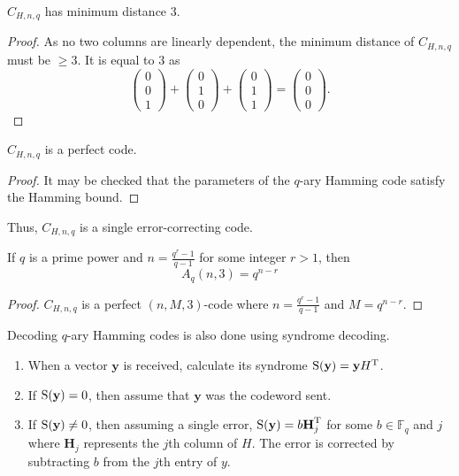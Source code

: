 \begin{theorem}
    $C_{H,n,q}$ has minimum distance $3$.
\end{theorem}
\begin{proof}
    As no two columns are linearly dependent, the minimum distance of $C_{H,n,q}$ must be $\geq 3$. It is equal to $3$ as
    $$
    \begin{pmatrix}
        0 \\ 0 \\ 1    
    \end{pmatrix}
    +
    \begin{pmatrix}
        0 \\ 1 \\ 0    
    \end{pmatrix}
    +
    \begin{pmatrix}
        0 \\ 1 \\ 1    
    \end{pmatrix}
    =
    \begin{pmatrix}
        0 \\ 0 \\ 0
    \end{pmatrix}.
    $$
\end{proof}

\begin{theorem}
    $C_{H,n,q}$ is a perfect code.
\end{theorem}
\begin{proof}
    It may be checked that the parameters of the $q$-ary Hamming code satisfy the Hamming bound.
\end{proof}

Thus, $C_{H,n,q}$ is a single error-correcting code.

\begin{corollary}
    If $q$ is a prime power and $n=\frac{q^r-1}{q-1}$ for some integer $r>1$, then
    $$A_q(n,3)=q^{n-r}$$
\end{corollary}
\begin{proof}
    $C_{H,n,q}$ is a perfect $(n,M,3)$-code where $n=\frac{q^r-1}{q-1}$ and $M=q^{n-r}$.
\end{proof}

Decoding $q$-ary Hamming codes is also done using syndrome decoding.
\begin{enumerate}
    \item When a vector $\textbf{y}$ is received, calculate its syndrome $\operatorname{S}(\textbf{y})=\textbf{y}H^\text{T}$.
    \item If $\operatorname{S}(\textbf{y})=0$, then assume that $\textbf{y}$ was the codeword sent.
    \item If $\operatorname{S}(\textbf{y})\neq 0$, then assuming a single error, $\operatorname{S}(\textbf{y})=b\textbf{H}^\text{T}_j$ for some $b\in\mathbb{F}_q$ and $j$ where $\textbf{H}_j$ represents the $j$th column of $H$. The error is corrected by subtracting $b$ from the $j$th entry of $y$.
\end{enumerate}

